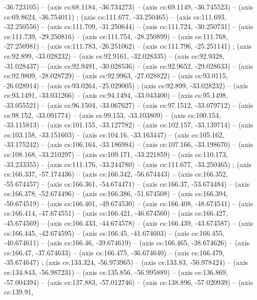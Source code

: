   -36.723105) -- (axis cs:68.1184, -36.734273) -- (axis cs:69.1149,
  -36.745523) -- (axis cs:69.8624, -36.754011) ; 
  (axis cs:111.677, -33.250465) -- (axis cs:111.693, -32.250556) -- (axis
  cs:111.709, -31.250644) -- (axis cs:111.724, -30.250731) -- (axis
  cs:111.739, -29.250816) -- (axis cs:111.754, -28.250899) -- (axis
  cs:111.768, -27.250981) -- (axis cs:111.783, -26.251062) -- (axis
  cs:111.796, -25.251141) ;  (axis cs:92.899,
  -33.028232) -- (axis cs:92.9161, -32.028335) -- (axis cs:92.9328,
  -31.028437) -- (axis cs:92.9491, -30.028536) -- (axis cs:92.9652,
  -29.028633) -- (axis cs:92.9809, -28.028729) -- (axis cs:92.9963,
  -27.028822) -- (axis cs:93.0115, -26.028914) -- (axis cs:93.0264,
  -25.029005) ;  (axis cs:92.899, -33.028232) --
  (axis cs:93.1491, -33.031266) -- (axis cs:94.1494, -33.043400) -- (axis
  cs:95.1498, -33.055521) -- (axis cs:96.1504, -33.067627) -- (axis
  cs:97.1512, -33.079712) -- (axis cs:98.152, -33.091774) -- (axis cs:99.153,
  -33.103809) -- (axis cs:100.154, -33.115813) -- (axis cs:101.155,
  -33.127782) -- (axis cs:102.157, -33.139714) -- (axis cs:103.158,
  -33.151603) -- (axis cs:104.16, -33.163447) -- (axis cs:105.162, -33.175242)
  -- (axis cs:106.164, -33.186984) -- (axis cs:107.166, -33.198670) -- (axis
  cs:108.168, -33.210297) -- (axis cs:109.171, -33.221859) -- (axis
  cs:110.173, -33.233355) -- (axis cs:111.176, -33.244780) -- (axis
  cs:111.677, -33.250465) ;  (axis cs:166.337,
  -57.174436) -- (axis cs:166.342, -56.674443) -- (axis cs:166.352,
  -55.674457) -- (axis cs:166.361, -54.674471) -- (axis cs:166.37, -53.674484)
  -- (axis cs:166.378, -52.674496) -- (axis cs:166.386, -51.674508) -- (axis
  cs:166.394, -50.674519) -- (axis cs:166.401, -49.674530) -- (axis
  cs:166.408, -48.674541) -- (axis cs:166.414, -47.674551) -- (axis
  cs:166.421, -46.674560) -- (axis cs:166.427, -45.674569) -- (axis
  cs:166.433, -44.674578) -- (axis cs:166.439, -43.674587) -- (axis
  cs:166.445, -42.674595) -- (axis cs:166.45, -41.674603) -- (axis cs:166.455,
  -40.674611) -- (axis cs:166.46, -39.674619) -- (axis cs:166.465, -38.674626)
  -- (axis cs:166.47, -37.674633) -- (axis cs:166.475, -36.674640) -- (axis
  cs:166.479, -35.674647) ;  (axis cs:133.324,
  -56.973965) -- (axis cs:133.83, -56.978424) -- (axis cs:134.843, -56.987231)
  -- (axis cs:135.856, -56.995889) -- (axis cs:136.869, -57.004394) -- (axis
  cs:137.883, -57.012746) -- (axis cs:138.896, -57.020939) -- (axis cs:139.91,
